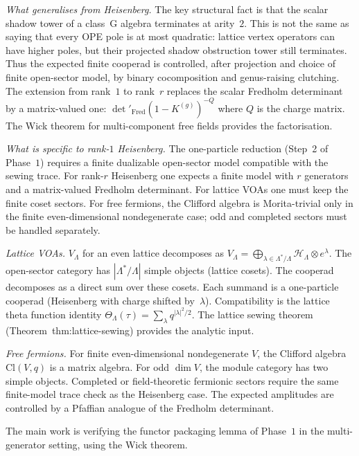 \documentclass[11pt]{article}
\newcommand{\cH}{\mathcal{H}}
\begin{document}
\noindent\emph{What generalises from Heisenberg.}
The key structural fact is that the scalar shadow tower of a
class~G algebra terminates at arity~$2$.  This is not the same
as saying that every OPE pole is at most quadratic: lattice
vertex operators can have higher poles, but their projected
shadow obstruction tower still terminates.  Thus the expected
finite cooperad is controlled, after projection and choice of
finite open-sector model, by binary cocomposition and
genus-raising clutching.  The extension from rank~$1$
to rank~$r$ replaces the scalar Fredholm determinant by a
matrix-valued one: $\det'_{\mathrm{Fred}}(1 - K^{(g)})^{-Q}$
where $Q$ is the charge matrix.  The Wick theorem for
multi-component free fields provides the factorisation.

\noindent\emph{What is specific to rank-$1$ Heisenberg.}
The one-particle reduction (Step~2 of Phase~$1$) requires a finite
dualizable open-sector model compatible with the sewing trace.  For
rank-$r$ Heisenberg one expects a finite model with $r$ generators
and a matrix-valued Fredholm determinant.  For lattice VOAs one must
keep the finite coset sectors.  For free fermions, the Clifford
algebra is Morita-trivial only in the finite even-dimensional
nondegenerate case; odd and completed sectors must be handled
separately.

\noindent\emph{Lattice VOAs.}
$V_\Lambda$ for an even lattice decomposes as
$V_\Lambda = \bigoplus_{\lambda \in \Lambda^*/\Lambda}
\cH_\Lambda \otimes e^\lambda$.
The open-sector category has $|\Lambda^*/\Lambda|$ simple
objects (lattice cosets).  The cooperad decomposes as a direct
sum over these cosets.  Each summand is a one-particle
cooperad (Heisenberg with charge shifted by~$\lambda$).
Compatibility is the lattice theta function identity
$\Theta_\Lambda(\tau) = \sum_\lambda q^{|\lambda|^2/2}$.
The lattice sewing theorem
(Theorem~\textup{thm:lattice-sewing}) provides the
analytic input.

\noindent\emph{Free fermions.}
For finite even-dimensional nondegenerate $V$, the Clifford algebra
$\mathrm{Cl}(V,q)$ is a matrix algebra.  For odd $\dim V$, the
module category has two simple objects.  Completed or field-theoretic
fermionic sectors require the same finite-model trace check as the
Heisenberg case.  The expected amplitudes are controlled by a
Pfaffian analogue of the Fredholm determinant.

The main work is verifying the functor packaging lemma of
Phase~$1$ in the multi-generator setting, using the Wick theorem.
\end{document}
